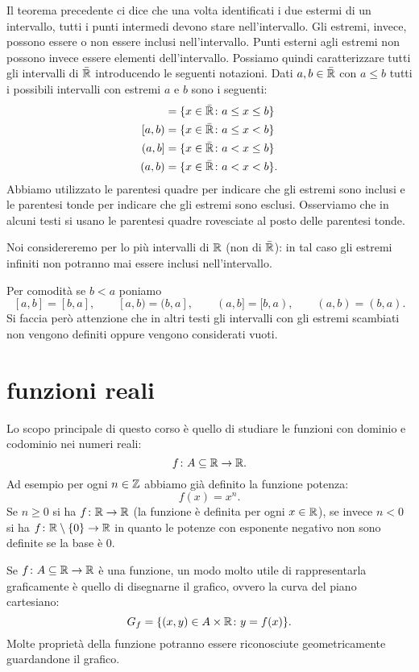 Il teorema precedente ci dice che una volta identificati i due estermi
di un intervallo, tutti i punti intermedi devono stare nell'intervallo.
Gli estremi, invece, possono essere o non essere inclusi nell'intervallo.
Punti esterni agli estremi non possono invece essere elementi dell'intervallo.
Possiamo quindi caratterizzare tutti gli intervalli di $\bar {\mathbb R}$
introducendo le seguenti notazioni. Dati $a,b\in \bar {\mathbb R}$ con $a\le b$
tutti i possibili intervalli con estremi $a$ e $b$ sono i seguenti:
\begin{align*}
[a,b] &= \{x\in \bar \RR\colon a \le x \le b\} \\
[a,b) &= \{x\in \bar \RR\colon a \le x < b\} \\
(a,b] &= \{x\in \bar \RR\colon a < x \le b\}\\
(a,b) &= \{x\in \bar \RR\colon a < x < b\}.
\end{align*}
Abbiamo utilizzato le parentesi quadre per indicare che gli estremi
sono inclusi e le parentesi tonde per indicare che gli estremi sono esclusi.
Osserviamo che in alcuni testi si usano le parentesi quadre rovesciate al posto
delle parentesi tonde.

Noi considereremo per lo più intervalli di $\mathbb R$ (non di $\bar {\mathbb R}$): in tal
caso gli estremi infiniti non potranno mai essere inclusi nell'intervallo.

Per comodità se $b<a$ poniamo
\[
  [a,b] = [b,a], \qquad
  [a,b) = (b,a], \qquad
  (a,b] = [b,a), \qquad
  (a,b) = (b,a).
\]
Si faccia però attenzione che in altri testi gli intervalli con gli estremi
scambiati non vengono definiti oppure vengono considerati vuoti.


\section{funzioni reali}

Lo scopo principale di questo corso è quello di studiare le
funzioni con dominio e codominio nei numeri reali:
\[
  f \colon A \subseteq \mathbb R \to \mathbb R.
\]
Ad esempio per ogni $n\in \mathbb Z$ abbiamo già definito la funzione
potenza:
\[
  f(x) = x^n.
\]
Se $n\ge 0$ si ha $f\colon \mathbb R \to \mathbb R$ (la funzione è definita
per ogni $x\in \mathbb R$), se invece $n<0$ si ha
$f\colon \mathbb R\setminus\{0\}\to \mathbb R$ in quanto le potenze
con esponente negativo non sono definite se la base è $0$.

Se $f\colon A \subseteq \mathbb R\to \mathbb R$ è una funzione, un modo molto
utile di rappresentarla graficamente è quello di disegnarne il
grafico, ovvero la curva del piano cartesiano:
\[
   G_f = \{(x,y)\in A\times \mathbb R\colon y = f(x)\}.
\]
Molte proprietà della funzione potranno essere riconosciute
geometricamente guardandone il grafico.

